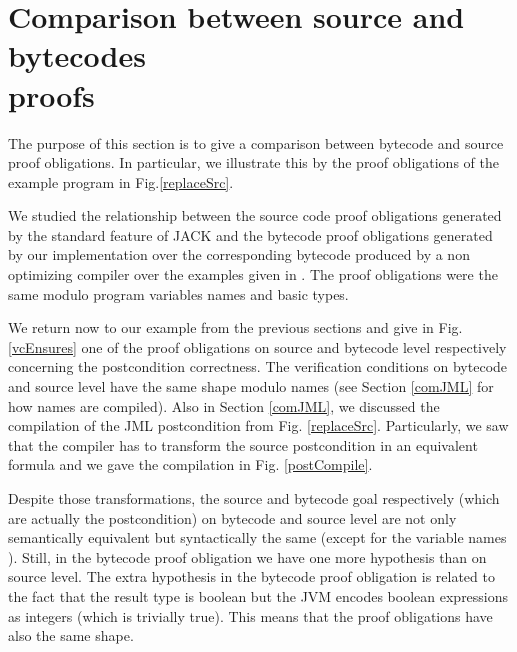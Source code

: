 
\section{Comparison between source and bytecodes \\ proofs}  \label{results}

The purpose of this section is to give a comparison between bytecode and source proof obligations.
In particular, we illustrate this by the proof obligations of the example program in Fig.\ref{replaceSrc}.

We studied the relationship between the source code proof obligations generated 
by the standard feature of JACK and the bytecode proof obligations generated by our implementation over the corresponding bytecode
 produced by a non optimizing compiler over the examples given in \cite{JPVC03JKM}. The proof obligations were the same modulo 
program variables names and basic types.

 We return now to our example from the previous sections and give in Fig. \ref{vcEnsures} one of the proof obligations on source 
and bytecode level respectively concerning the postcondition correctness. The verification conditions on bytecode and source level
 have the same shape modulo names (see Section \ref{comJML} for how names are compiled). Also in Section
 \ref{comJML}, we discussed the compilation of the JML postcondition from Fig. \ref{replaceSrc}. Particularly,
 we saw that the compiler has to transform the source postcondition in an equivalent formula and we
 gave the compilation in Fig. \ref{postCompile}. 

Despite those transformations, the source and bytecode goal respectively (which are actually the postcondition) on bytecode and source level are not only
semantically equivalent but syntactically the same (except for the variable names ). Still, in the bytecode proof obligation we have one more hypothesis than on source level. The extra hypothesis in the bytecode proof obligation is related to the fact that the result type is boolean but the JVM encodes boolean expressions as integers (which is trivially true). This means that the proof obligations have also the same shape.

